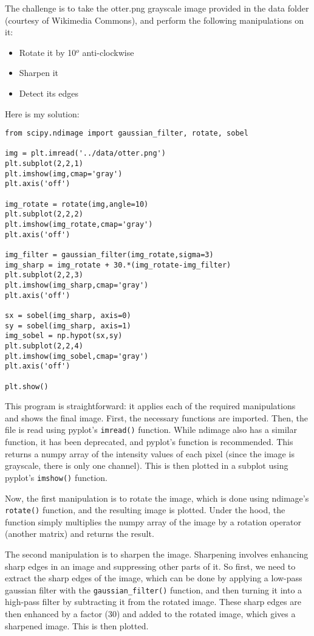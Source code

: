 \documentclass[12pt]{article}
\newcommand{\code}{\texttt}
\begin{document}
The challenge is to take the otter.png grayscale image provided in the data folder (courtesy of Wikimedia Commons), and perform the following manipulations on it:

\begin{itemize}
	\item Rotate it by 10$^o$ anti-clockwise
	\item Sharpen it
	\item Detect its edges
\end{itemize}

Here is my solution:

\begin{lstlisting}[frame=single] 
from scipy.ndimage import gaussian_filter, rotate, sobel

img = plt.imread('../data/otter.png')
plt.subplot(2,2,1)
plt.imshow(img,cmap='gray')
plt.axis('off')

img_rotate = rotate(img,angle=10)
plt.subplot(2,2,2)
plt.imshow(img_rotate,cmap='gray')
plt.axis('off')

img_filter = gaussian_filter(img_rotate,sigma=3)
img_sharp = img_rotate + 30.*(img_rotate-img_filter)
plt.subplot(2,2,3)
plt.imshow(img_sharp,cmap='gray')
plt.axis('off')

sx = sobel(img_sharp, axis=0)
sy = sobel(img_sharp, axis=1)
img_sobel = np.hypot(sx,sy)
plt.subplot(2,2,4)
plt.imshow(img_sobel,cmap='gray')
plt.axis('off')

plt.show()
\end{lstlisting}

This program is straightforward: it applies each of the required manipulations and shows the final image. First, the necessary functions are imported. Then, the file is read using pyplot's \code{imread()} function. While ndimage also has a similar function, it has been deprecated, and pyplot's function is recommended. This returns a numpy array of the intensity values of each pixel (since the image is grayscale, there is only one channel). This is then plotted in a subplot using pyplot's \code{imshow()} function.

Now, the first manipulation is to rotate the image, which is done using ndimage's \code{rotate()} function, and the resulting image is plotted. Under the hood, the function simply multiplies the numpy array of the image by a rotation operator (another matrix) and returns the result. 

The second manipulation is to sharpen the image. Sharpening involves enhancing sharp edges in an image and suppressing other parts of it. So first, we need to extract the sharp edges of the image, which can be done by applying a low-pass gaussian filter with the \code{gaussian\_filter()} function, and then turning it into a high-pass filter by subtracting it from the rotated image. These sharp edges are then enhanced by a factor (30) and added to the rotated image, which gives a sharpened image. This is then plotted. 
\end{document}
